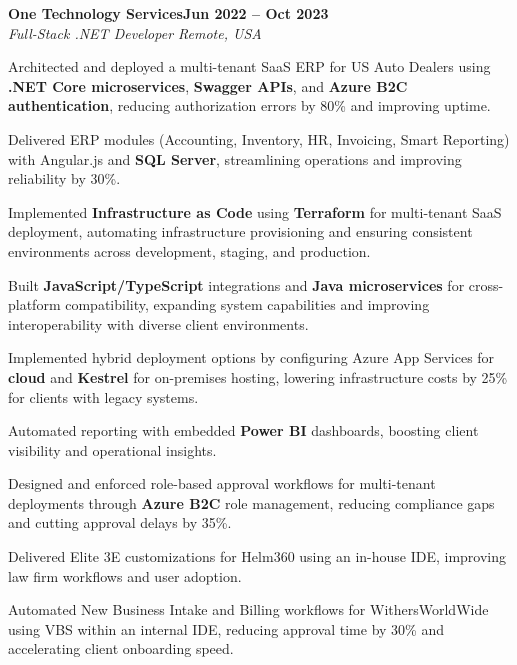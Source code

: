 \documentclass[letterpaper,10pt]{article}
\newcommand{\headingBf}[2]{
  \hspace{10pt}\textbf{#1}\hfill\textbf{#2}\\
}
\newcommand{\headingIt}[2]{
  \hspace{10pt}\textit{#1}\hfill\textit{#2}\\
}
\newenvironment{resume_list}{
  \vspace{-7pt}
  \begin{itemize}[itemsep=-2px, parsep=1pt, leftmargin=30pt]
}{
  \end{itemize}
}
\begin{document}
\headingBf{One Technology Services}{Jun 2022 -- Oct 2023}
\headingIt{Full-Stack .NET Developer \hfill Remote, USA}{}
\begin{resume_list}
    \item Architected and deployed a multi-tenant SaaS ERP for US Auto Dealers using \textbf{.NET Core microservices}, \textbf{Swagger APIs}, and \textbf{Azure B2C authentication}, reducing authorization errors by 80\% and improving uptime.
    \item Delivered ERP modules (Accounting, Inventory, HR, Invoicing, Smart Reporting) with Angular.js and \textbf{SQL Server}, streamlining operations and improving reliability by 30\%.
    \item Implemented \textbf{Infrastructure as Code} using \textbf{Terraform} for multi-tenant SaaS deployment, automating infrastructure provisioning and ensuring consistent environments across development, staging, and production.
    \item Built \textbf{JavaScript/TypeScript} integrations and \textbf{Java microservices} for cross-platform compatibility, expanding system capabilities and improving interoperability with diverse client environments.
    \item Implemented hybrid deployment options by configuring Azure App Services for \textbf{cloud} and \textbf{Kestrel} for on-premises hosting, lowering infrastructure costs by 25\% for clients with legacy systems.
    \item Automated reporting with embedded \textbf{Power BI} dashboards, boosting client visibility and operational insights.   
    \item Designed and enforced role-based approval workflows for multi-tenant deployments through \textbf{Azure B2C} role management, reducing compliance gaps and cutting approval delays by 35\%.
    \item Delivered Elite 3E customizations for Helm360 using an in-house IDE, improving law firm workflows and user adoption.
    \item Automated New Business Intake and Billing workflows for WithersWorldWide using VBS within an internal IDE, reducing approval time by 30\% and accelerating client onboarding speed.
\end{resume_list}
\end{document}
